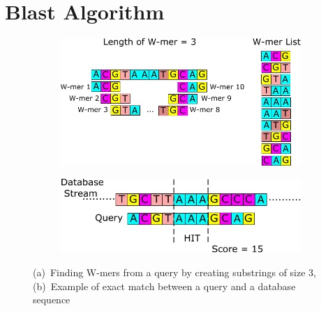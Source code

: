 \section{Blast Algorithm}
\label{sec:blast}

\begin{figure}[t!]
\centering
	\begin{subfigure}[]
    \centering
    \includegraphics[width=0.8\columnwidth]{Figures/Algorithm1.pdf} 
    \end{subfigure}
	\begin{subfigure}[]
    \centering
    \includegraphics[width=0.8\columnwidth]{Figures/Algorithm2.pdf}
	\end{subfigure}
	\caption{(a)~Finding W-mers from a query by creating substrings of size 3, (b)~Example of exact match between a query and a database sequence}
	\label{fig:step12}
\end{figure}

